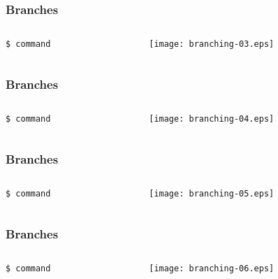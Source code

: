 \documentclass[english]{beamer}
\newcommand{\cmd}[1]{%
\texttt{\textcolor{code-orange}{#1}}%
}
\begin{document}
\begin{frame}
\frametitle{Branches}

\begin{columns}[t]
        \begin{column}[T]{.5\textwidth}
                \cmd{\$ command} \\
        \end{column}
        \begin{column}[T]{.5\textwidth}
                \texttt{[image: branching-03.eps]}
        \end{column}
\end{columns}
\end{frame}

\begin{frame}
\frametitle{Branches}

\begin{columns}[t]
        \begin{column}[T]{.5\textwidth}
                \cmd{\$ command} \\
        \end{column}
        \begin{column}[T]{.5\textwidth}
                \texttt{[image: branching-04.eps]}
        \end{column}
\end{columns}
\end{frame}

\begin{frame}
\frametitle{Branches}

\begin{columns}[t]
        \begin{column}[T]{.5\textwidth}
                \cmd{\$ command} \\
        \end{column}
        \begin{column}[T]{.5\textwidth}
                \texttt{[image: branching-05.eps]}
        \end{column}
\end{columns}
\end{frame}

\begin{frame}
\frametitle{Branches}

\begin{columns}[t]
        \begin{column}[T]{.5\textwidth}
                \cmd{\$ command} \\
        \end{column}
        \begin{column}[T]{.5\textwidth}
                \texttt{[image: branching-06.eps]}
        \end{column}
\end{columns}
\end{frame}
\end{document}
